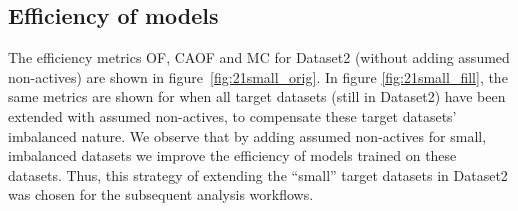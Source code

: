 \documentclass[utf8]{frontiersSCNS} %
\begin{document}
\subsection*{Efficiency of models}
The efficiency metrics OF, CAOF and MC for Dataset2 (without adding assumed non-actives)
are shown in figure~\ref{fig:21small_orig}. In figure \ref{fig:21small_fill},
the same metrics are shown for when all target datasets (still in Dataset2)
have been extended with assumed non-actives, to compensate these target
datasets' imbalanced nature.
We observe that by adding assumed non-actives for small, imbalanced datasets we
improve the efficiency of models trained on these datasets. Thus, this strategy
of extending the ``small'' target datasets in Dataset2 was chosen for the
subsequent analysis workflows.
\end{document}
